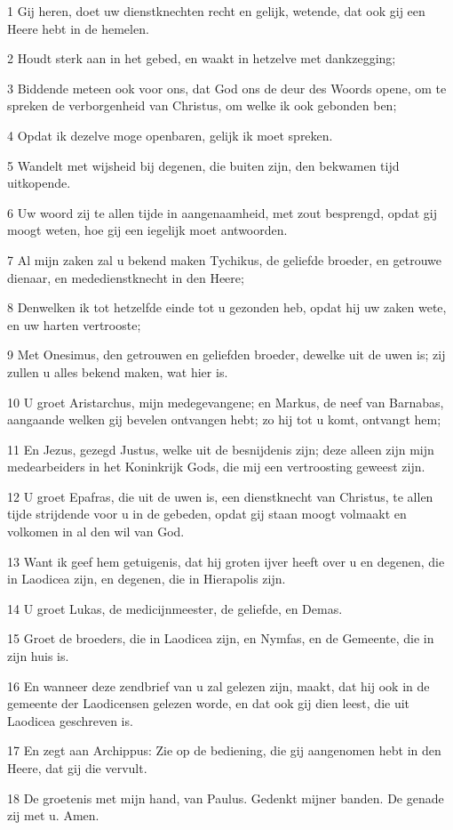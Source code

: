 \par 1 Gij heren, doet uw dienstknechten recht en gelijk, wetende, dat ook gij een Heere hebt in de hemelen.
\par 2 Houdt sterk aan in het gebed, en waakt in hetzelve met dankzegging;
\par 3 Biddende meteen ook voor ons, dat God ons de deur des Woords opene, om te spreken de verborgenheid van Christus, om welke ik ook gebonden ben;
\par 4 Opdat ik dezelve moge openbaren, gelijk ik moet spreken.
\par 5 Wandelt met wijsheid bij degenen, die buiten zijn, den bekwamen tijd uitkopende.
\par 6 Uw woord zij te allen tijde in aangenaamheid, met zout besprengd, opdat gij moogt weten, hoe gij een iegelijk moet antwoorden.
\par 7 Al mijn zaken zal u bekend maken Tychikus, de geliefde broeder, en getrouwe dienaar, en mededienstknecht in den Heere;
\par 8 Denwelken ik tot hetzelfde einde tot u gezonden heb, opdat hij uw zaken wete, en uw harten vertrooste;
\par 9 Met Onesimus, den getrouwen en geliefden broeder, dewelke uit de uwen is; zij zullen u alles bekend maken, wat hier is.
\par 10 U groet Aristarchus, mijn medegevangene; en Markus, de neef van Barnabas, aangaande welken gij bevelen ontvangen hebt; zo hij tot u komt, ontvangt hem;
\par 11 En Jezus, gezegd Justus, welke uit de besnijdenis zijn; deze alleen zijn mijn medearbeiders in het Koninkrijk Gods, die mij een vertroosting geweest zijn.
\par 12 U groet Epafras, die uit de uwen is, een dienstknecht van Christus, te allen tijde strijdende voor u in de gebeden, opdat gij staan moogt volmaakt en volkomen in al den wil van God.
\par 13 Want ik geef hem getuigenis, dat hij groten ijver heeft over u en degenen, die in Laodicea zijn, en degenen, die in Hierapolis zijn.
\par 14 U groet Lukas, de medicijnmeester, de geliefde, en Demas.
\par 15 Groet de broeders, die in Laodicea zijn, en Nymfas, en de Gemeente, die in zijn huis is.
\par 16 En wanneer deze zendbrief van u zal gelezen zijn, maakt, dat hij ook in de gemeente der Laodicensen gelezen worde, en dat ook gij dien leest, die uit Laodicea geschreven is.
\par 17 En zegt aan Archippus: Zie op de bediening, die gij aangenomen hebt in den Heere, dat gij die vervult.
\par 18 De groetenis met mijn hand, van Paulus. Gedenkt mijner banden. De genade zij met u. Amen.



